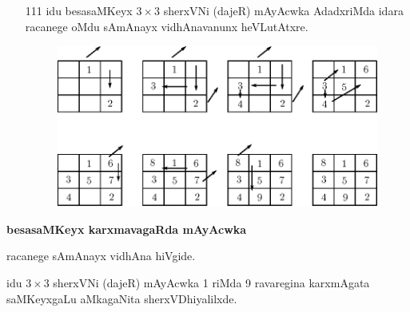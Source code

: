 \begin{enumerate}
\item[{\rm 111}] idu besasaMKeyx $3\times 3$ sherxVNi (dajeR) mAyAcwka AdadxriMda idara racanege oMdu sAmAnayx vidhAnavanunx heVLutAtxre.
\begin{figure}[H]
\centering
\includegraphics[scale=.8]{src/figures/m_117a.eps}
\end{figure}
\end{enumerate}

{\bf besasaMKeyx karxmavagaRda mAyAcwka}

racanege sAmAnayx vidhAna hiVgide.

idu $3\times 3$ sherxVNi (dajeR) mAyAcwka {\rm 1} riMda {\rm 9} ravaregina karxmAgata saMKeyxgaLu aMkagaNita sherxVDhiyalilxde.

